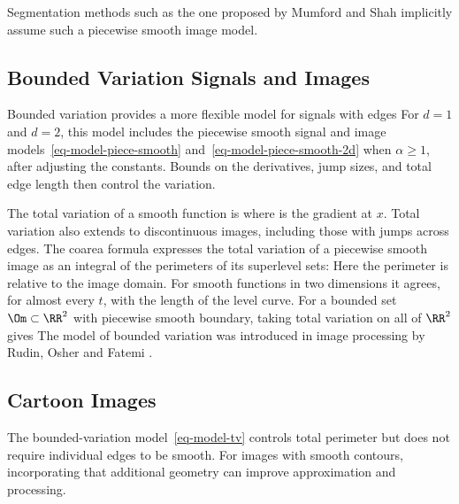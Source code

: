 Segmentation methods such as the one proposed by Mumford and Shah \cite{mumford-shah} implicitly assume such a piecewise smooth image model.

                                           
\subsection{Bounded Variation Signals and Images}
\label{subsec-bv-model}

Bounded variation provides a more flexible model for signals with edges
For $d=1$ and $d=2$, this model includes the piecewise smooth signal and image models~\eqref{eq-model-piece-smooth} and~\eqref{eq-model-piece-smooth-2d} when $\alpha\geq1$, after adjusting the constants. Bounds on the derivatives, jump sizes, and total edge length then control the variation.

The total variation of a smooth function is 
where 
is the gradient at $x$. Total variation also extends to discontinuous images, including those with jumps across edges. The coarea formula expresses the total variation of a piecewise smooth image as an integral of the perimeters of its superlevel sets:
Here the perimeter is relative to the image domain. For smooth functions in two dimensions it agrees, for almost every $t$, with the length of the level curve. For a bounded set $\Om\subset\RR^2$ with piecewise smooth boundary, taking total variation on all of $\RR^2$ gives
The model of bounded variation was introduced in image processing by Rudin, Osher and Fatemi \cite{rudin-tv}.

                                           
\subsection{Cartoon Images}
\label{subsec-cartoon-images}

The bounded-variation model~\eqref{eq-model-tv} controls total perimeter but does not require individual edges to be smooth. For images with smooth contours, incorporating that additional geometry can improve approximation and processing.

